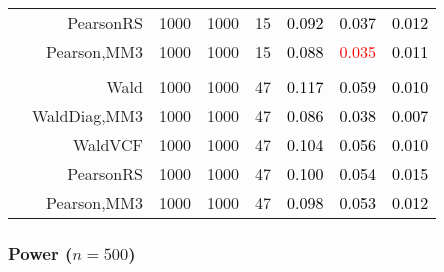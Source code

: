 \documentclass[
]{article}
\begin{document}
\begin{table}[H]
{\begin{tabular}[t]{lrrrrrrr}
\hspace{1em} & PearsonRS & 1000 & 1000 & 15 & \textcolor{black}{0.092} & \textcolor{black}{0.037} & \textcolor{black}{0.012}\\

\hspace{1em} & Pearson,MM3 & 1000 & 1000 & 15 & \textcolor{black}{0.088} & \textcolor{red}{0.035} & \textcolor{black}{0.011}\\
\cmidrule{1-8}
\addlinespace[0.3em]
\multicolumn{8}{l}{\textbf{3F 15V}}\\
\hspace{1em} & Wald & 1000 & 1000 & 47 & \textcolor{black}{0.117} & \textcolor{black}{0.059} & \textcolor{black}{0.010}\\

\hspace{1em} & WaldDiag,MM3 & 1000 & 1000 & 47 & \textcolor{black}{0.086} & \textcolor{black}{0.038} & \textcolor{black}{0.007}\\

\hspace{1em} & WaldVCF & 1000 & 1000 & 47 & \textcolor{black}{0.104} & \textcolor{black}{0.056} & \textcolor{black}{0.010}\\

\hspace{1em} & PearsonRS & 1000 & 1000 & 47 & \textcolor{black}{0.100} & \textcolor{black}{0.054} & \textcolor{black}{0.015}\\

\hspace{1em} & Pearson,MM3 & 1000 & 1000 & 47 & \textcolor{black}{0.098} & \textcolor{black}{0.053} & \textcolor{black}{0.012}\\
\bottomrule
\end{tabular}}
\endgroup{}
\end{table}

\hypertarget{power-n500}{%
\subsubsection{\texorpdfstring{Power
(\(n=500\))}{Power (n=500)}}\label{power-n500}}
\end{document}
